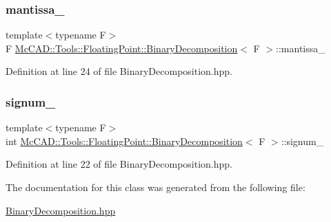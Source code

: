 \subsubsection{\texorpdfstring{mantissa\+\_\+}{mantissa\_}}
{\footnotesize\ttfamily template$<$typename F$>$ \\
F \hyperlink{classMcCAD_1_1Tools_1_1FloatingPoint_1_1BinaryDecomposition}{Mc\+C\+A\+D\+::\+Tools\+::\+Floating\+Point\+::\+Binary\+Decomposition}$<$ F $>$\+::mantissa\+\_\+\hspace{0.3cm}{\ttfamily [private]}}



Definition at line 24 of file Binary\+Decomposition.\+hpp.

\mbox{\label{classMcCAD_1_1Tools_1_1FloatingPoint_1_1BinaryDecomposition_a91a2c83beede49f606b6eff17eb78ec6}} 
\subsubsection{\texorpdfstring{signum\+\_\+}{signum\_}}
{\footnotesize\ttfamily template$<$typename F$>$ \\
int \hyperlink{classMcCAD_1_1Tools_1_1FloatingPoint_1_1BinaryDecomposition}{Mc\+C\+A\+D\+::\+Tools\+::\+Floating\+Point\+::\+Binary\+Decomposition}$<$ F $>$\+::signum\+\_\+\hspace{0.3cm}{\ttfamily [private]}}



Definition at line 22 of file Binary\+Decomposition.\+hpp.



The documentation for this class was generated from the following file\+:\begin{DoxyCompactItemize}
\item 
\hyperlink{BinaryDecomposition_8hpp}{Binary\+Decomposition.\+hpp}\end{DoxyCompactItemize}
